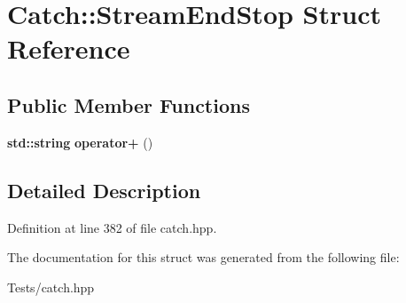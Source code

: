\hypertarget{struct_catch_1_1_stream_end_stop}{}\section{Catch\+:\+:Stream\+End\+Stop Struct Reference}
\label{struct_catch_1_1_stream_end_stop}
\subsection*{Public Member Functions}
\begin{DoxyCompactItemize}
\item 
\mbox{\label{struct_catch_1_1_stream_end_stop_a3025092e06c224e0845f2caa07b26d0e}} 
\textbf{ std\+::string} {\bfseries operator+} ()
\end{DoxyCompactItemize}


\subsection{Detailed Description}


Definition at line 382 of file catch.\+hpp.



The documentation for this struct was generated from the following file\+:\begin{DoxyCompactItemize}
\item 
Tests/catch.\+hpp\end{DoxyCompactItemize}
